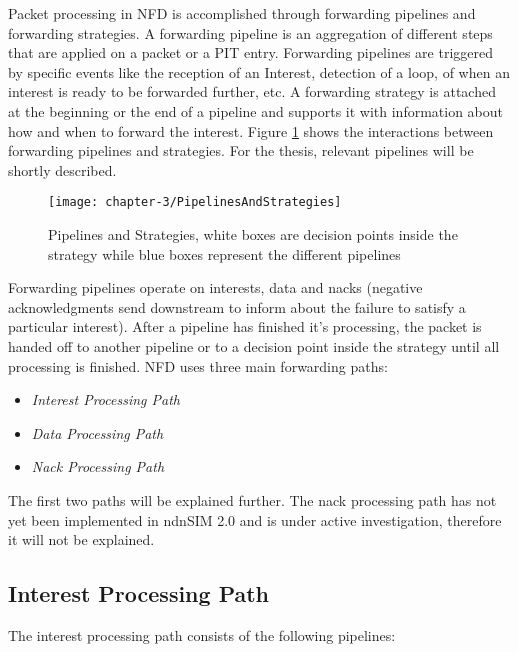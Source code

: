 Packet processing in NFD is accomplished through forwarding pipelines and forwarding strategies. A forwarding pipeline is an aggregation of different steps that are applied on a packet or a PIT entry. Forwarding pipelines are triggered by specific events like the reception of an Interest, detection of a loop, of when an interest is ready to be forwarded further, etc. A forwarding strategy is attached at the beginning or the end of a pipeline and supports it with information about how and when to forward the interest. Figure \ref{fig:PipelinesAndStrategies} shows the interactions between forwarding pipelines and strategies. For the thesis, relevant pipelines will be shortly described.

\begin{figure}[H]
  \centering
  \texttt{[image: chapter-3/PipelinesAndStrategies]}
  \caption{Pipelines and Strategies, white boxes are decision points inside the strategy while blue boxes represent the different pipelines \cite{Afanasyev16}}
  \label{fig:PipelinesAndStrategies}
\end{figure}

Forwarding pipelines operate on interests, data and nacks (negative acknowledgments send downstream to inform about the failure to satisfy a particular interest). After a pipeline has finished it's processing, the packet is handed off to another pipeline or to a decision point inside the strategy until all processing is finished. NFD uses three main forwarding paths:

\begin{itemize}
\item \emph{Interest Processing Path}
\item \emph{Data Processing Path}
\item \emph{Nack Processing Path}
\end{itemize}

The first two paths will be explained further. The nack processing path has not yet been implemented in ndnSIM 2.0 and is under active investigation, therefore it will not be explained.

\subsection{Interest Processing Path}

The interest processing path consists of the following pipelines:

